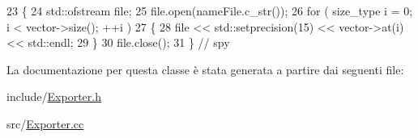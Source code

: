 \begin{DoxyCode}
23 \{
24     std::ofstream file;
25     file.open(nameFile.c\_str());
26     \textcolor{keywordflow}{for} ( size\_type i = 0; i < vector->size(); ++i )
27     \{
28         file << std::setprecision(15) << vector->at(i) << std::endl;
29     \}
30     file.close();
31 \} \textcolor{comment}{// spy}
\end{DoxyCode}


La documentazione per questa classe è stata generata a partire dai seguenti file\-:\begin{DoxyCompactItemize}
\item 
include/\hyperlink{Exporter_8h}{Exporter.\-h}\item 
src/\hyperlink{Exporter_8cc}{Exporter.\-cc}\end{DoxyCompactItemize}
